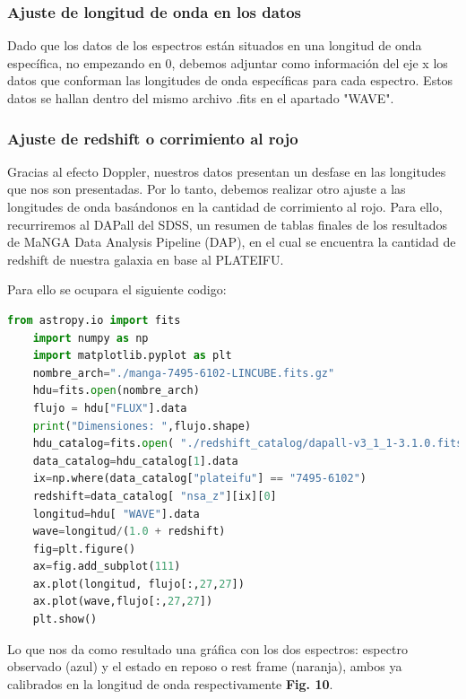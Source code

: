 \documentclass[9pt,twocolumn,a4paper]{opticajnl}
\begin{document}
\subsubsection*{Ajuste de longitud de onda en los datos}
Dado que los datos de los espectros están situados en una longitud de onda específica, no empezando en 0, debemos adjuntar como información del eje x los datos que conforman las longitudes de onda específicas para cada espectro. Estos datos se hallan dentro del mismo archivo .fits en el apartado "WAVE".

\subsubsection*{Ajuste de redshift o corrimiento al rojo}
Gracias al efecto Doppler, nuestros datos presentan un desfase en las longitudes que nos son presentadas. Por lo tanto, debemos realizar otro ajuste a las longitudes de onda basándonos en la cantidad de corrimiento al rojo. Para ello, recurriremos al DAPall del SDSS, un resumen de tablas finales de los resultados de MaNGA Data Analysis Pipeline (DAP), en el cual se encuentra la cantidad de redshift de nuestra galaxia en base al PLATEIFU.

Para ello se ocupara el siguiente codigo:

\begin{lstlisting}[language=Python]
    from astropy.io import fits
    import numpy as np 
    import matplotlib.pyplot as plt
    nombre_arch="./manga-7495-6102-LINCUBE.fits.gz"
    hdu=fits.open(nombre_arch)
    flujo = hdu["FLUX"].data
    print("Dimensiones: ",flujo.shape)
    hdu_catalog=fits.open( "./redshift_catalog/dapall-v3_1_1-3.1.0.fits")
    data_catalog=hdu_catalog[1].data
    ix=np.where(data_catalog["plateifu"] == "7495-6102") 
    redshift=data_catalog[ "nsa_z"][ix][0]
    longitud=hdu[ "WAVE"].data
    wave=longitud/(1.0 + redshift)
    fig=plt.figure()
    ax=fig.add_subplot(111)
    ax.plot(longitud, flujo[:,27,27]) 
    ax.plot(wave,flujo[:,27,27])
    plt.show()
\end{lstlisting}

Lo que nos da como resultado una gráfica con los dos espectros: espectro observado (azul) y el estado en reposo o rest frame (naranja), ambos ya calibrados en la longitud de onda respectivamente \textbf{Fig. 10}.
\end{document}
